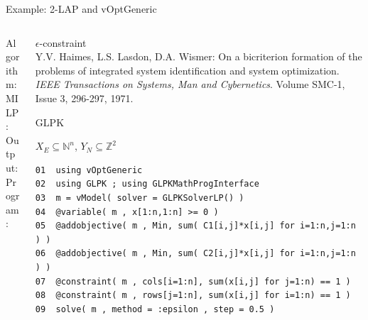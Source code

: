 \documentclass[10pt,xcolor=dvipsnames]{beamer}
\newcommand{\mN}{\mathbb{N}}
\newcommand{\Z}{\mathbb{Z}}
\begin{document}
\begin{frame}[fragile=singleslide]{Example: 2-LAP and vOptGeneric}

\vspace{5mm}
\begin{columns}
%
\begin{column}{0.15\textwidth}
Algorithm: \\
\vspace{18mm}
MILP:\\  
\vspace{2mm}
Output: \\
\vspace{6mm}
Program:
\vspace{30mm}
\end{column}
\begin{column}{0.85\textwidth}
         $\epsilon$-constraint \vspace{1mm}\\
         {\footnotesize Y.V. Haimes, L.S. Lasdon, D.A. Wismer: On a bicriterion formation of the problems of integrated system identification and system optimization. 
         \textit{IEEE Transactions on Systems, Man and Cybernetics}. Volume SMC-1, Issue 3, 296-297, 1971.\\}
\medskip

         GLPK
\medskip

$X_E \subseteq \mN^n$, $Y_N \subseteq \Z^2$
\vspace{3mm}

{\footnotesize
\begin{verbatim}
01  using vOptGeneric
02  using GLPK ; using GLPKMathProgInterface
03  m = vModel( solver = GLPKSolverLP() )
04  @variable( m , x[1:n,1:n] >= 0 )
05  @addobjective( m , Min, sum( C1[i,j]*x[i,j] for i=1:n,j=1:n ) )
06  @addobjective( m , Min, sum( C2[i,j]*x[i,j] for i=1:n,j=1:n ) )
07  @constraint( m , cols[i=1:n], sum(x[i,j] for j=1:n) == 1 )
08  @constraint( m , rows[j=1:n], sum(x[i,j] for i=1:n) == 1 )
09  solve( m , method = :epsilon , step = 0.5 )
\end{verbatim}
}


          
\end{column}
%
\end{columns}         

       
\end{frame}
\end{document}
